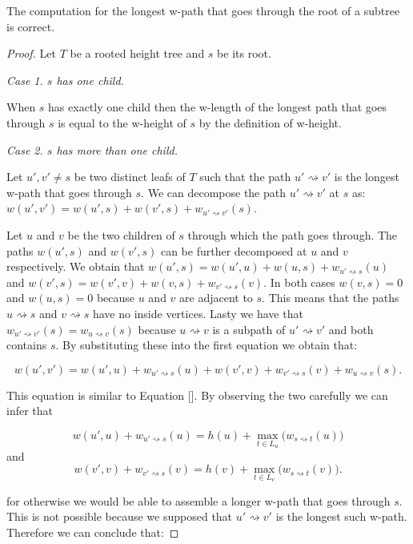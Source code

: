 \begin{lem} The computation for the longest w-path that goes through the root of a subtree is correct. \end{lem}
\begin{proof}

   Let $T$ be a rooted height tree and $s$ be its root.

   \em Case 1. $s$ has one child. \em

   When $s$ has exactly one child then the w-length of the longest path that goes through $s$ is equal to the w-height of $s$ by the definition of w-height.

   \em Case 2. $s$ has more than one child. \em

   Let $u', v' \ne s$ be two distinct leafs of $T$ such that the path $u' \rightsquigarrow v'$ is the longest w-path that goes through $s$.
   We can decompose the path $u' \rightsquigarrow v'$ at $s$ as: $w(u', v') = w(u', s) + w(v', s) + w_{u' \rightsquigarrow v'}(s)$.

   Let $u$ and $v$ be the two children of $s$ through which the path goes through.
   The paths $w(u', s)$ and $w(v', s)$ can be further decomposed at $u$ and $v$ respectively. We obtain that
   $w(u', s) = w(u', u) + w(u, s) + w_{u' \rightsquigarrow s}(u)$ and
   $w(v', s) = w(v', v) + w(v, s) + w_{v' \rightsquigarrow s}(v)$.
   In both cases $w(v, s) = 0$ and $w(u, s) = 0$ because $u$ and $v$ are adjacent to $s$. This means that the paths $u \rightsquigarrow s$ and $v \rightsquigarrow s$ have no inside vertices.
   Lasty we have that $w_{u' \rightsquigarrow v'}(s) = w_{u \rightsquigarrow v}(s)$ because $u \rightsquigarrow v$ is a subpath of $u' \rightsquigarrow v'$ and both contains $s$.
   By substituting these into the first equation we obtain that:

   $$w(u', v') = w(u', u) + w_{u' \rightsquigarrow s}(u) + w(v', v) + w_{v' \rightsquigarrow s}(v) + w_{u \rightsquigarrow v}(s). $$

   This equation is similar to Equation []. By observing the two carefully we can infer that

   $$w(u', u) + w_{u' \rightsquigarrow s}(u) = h(u) + \max\limits_{t \in L_u}\Big(w_{s \rightsquigarrow t}(u)\Big)$$
   and
   $$w(v', v) + w_{v' \rightsquigarrow s}(v) = h(v) + \max\limits_{t \in L_v}\Big(w_{s \rightsquigarrow t}(v)\Big).$$

   for otherwise we would be able to assemble a longer w-path that goes through $s$. This is not possible because we supposed that $u' \rightsquigarrow v'$ is the longest such w-path. Therefore we can conclude that:


\end{proof}
